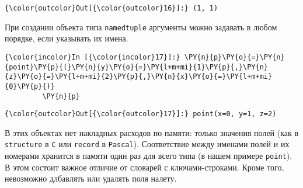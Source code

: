 \begin{Verbatim}[commandchars=\\\{\}]
{\color{outcolor}Out[{\color{outcolor}16}]:} (1, 1)
\end{Verbatim}
            
    При создании объекта типа \texttt{namedtuple} аргументы можно задавать в
любом порядке, если указывать их имена.

    \begin{Verbatim}[commandchars=\\\{\}]
{\color{incolor}In [{\color{incolor}17}]:} \PY{n}{p}\PY{o}{=}\PY{n}{point}\PY{p}{(}\PY{n}{y}\PY{o}{=}\PY{l+m+mi}{1}\PY{p}{,}\PY{n}{z}\PY{o}{=}\PY{l+m+mi}{2}\PY{p}{,}\PY{n}{x}\PY{o}{=}\PY{l+m+mi}{0}\PY{p}{)}
         \PY{n}{p}
\end{Verbatim}


\begin{Verbatim}[commandchars=\\\{\}]
{\color{outcolor}Out[{\color{outcolor}17}]:} point(x=0, y=1, z=2)
\end{Verbatim}
            
    В этих объектах нет накладных расходов по памяти: только значения полей
(как в \texttt{structure} в \texttt{C} или \texttt{record} в
\texttt{Pascal}). Соответствие между именами полей и их номерами
хранится в памяти один раз для всего типа (в нашем примере
\texttt{point}). В этом состоит важное отличие от словарей с
ключами-строками. Кроме того, невозможно длбавлять или удалять поля
налету.
